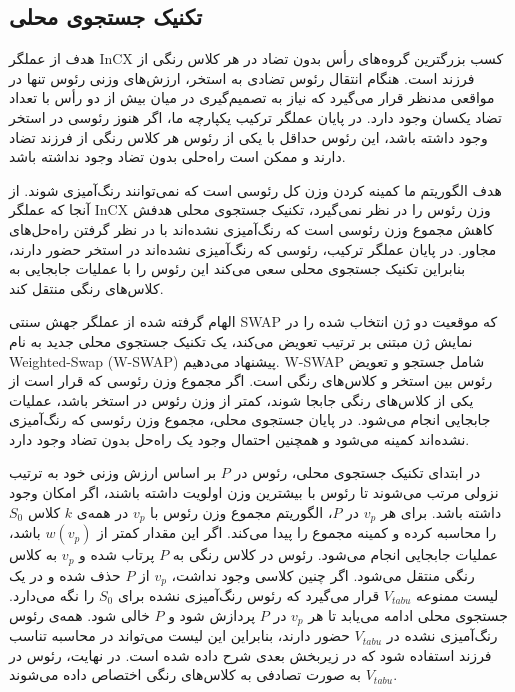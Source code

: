 \documentclass[a4paper,10pt]{article}
\begin{document}
        \subsection{تکنیک جستجوی محلی}
            
            هدف از عملگر InCX کسب بزرگترین گروه‌های رأس بدون تضاد در هر کلاس رنگی از فرزند است. هنگام انتقال رئوس تضادی به استخر، ارزش‌های وزنی رئوس تنها در مواقعی مدنظر قرار می‌گیرد که نیاز به تصمیم‌گیری در میان بیش از دو رأس با تعداد تضاد یکسان وجود دارد. در پایان عملگر ترکیب یکپارچه ما، اگر هنوز رئوسی در استخر وجود داشته باشد، این رئوس حداقل با یکی از رئوس هر کلاس رنگی از فرزند تضاد دارند و ممکن است راه‌حلی بدون تضاد وجود نداشته باشد.

            هدف الگوریتم ما کمینه کردن وزن کل رئوسی است که نمی‌توانند رنگ‌آمیزی شوند. از آنجا که عملگر InCX وزن رئوس را در نظر نمی‌گیرد، تکنیک جستجوی محلی هدفش کاهش مجموع وزن رئوسی است که رنگ‌آمیزی نشده‌اند با در نظر گرفتن راه‌حل‌های مجاور. در پایان عملگر ترکیب، رئوسی که رنگ‌آمیزی نشده‌اند در استخر حضور دارند، بنابراین تکنیک جستجوی محلی سعی می‌کند این رئوس را با عملیات جابجایی به کلاس‌های رنگی منتقل کند.

            الهام گرفته شده از عملگر جهش سنتی SWAP که موقعیت دو ژن انتخاب شده را در نمایش ژن مبتنی بر ترتیب تعویض می‌کند، یک تکنیک جستجوی محلی جدید به نام Weighted-Swap (W-SWAP) پیشنهاد می‌دهیم. W-SWAP شامل جستجو و تعویض رئوس بین استخر و کلاس‌های رنگی است. اگر مجموع وزن رئوسی که قرار است از یکی از کلاس‌های رنگی جابجا شوند، کمتر از وزن رئوس در استخر باشد، عملیات جابجایی انجام می‌شود. در پایان جستجوی محلی، مجموع وزن رئوسی که رنگ‌آمیزی نشده‌اند کمینه می‌شود و همچنین احتمال وجود یک راه‌حل بدون تضاد وجود دارد.

            در ابتدای تکنیک جستجوی محلی، رئوس در $P$ بر اساس ارزش وزنی خود به ترتیب نزولی مرتب می‌شوند تا رئوس با بیشترین وزن اولویت داشته باشند، اگر امکان وجود داشته باشد. برای هر $v_p$ در $P$، الگوریتم مجموع وزن رئوس با $v_p$ در همه‌ی $k$ کلاس $S_0$ را محاسبه کرده و کمینه مجموع را پیدا می‌کند. اگر این مقدار کمتر از $w(v_p)$ باشد، عملیات جابجایی انجام می‌شود. رئوس در کلاس رنگی به $P$ پرتاب شده و $v_p$ به کلاس رنگی منتقل می‌شود. اگر چنین کلاسی وجود نداشت، $v_p$ از $P$ حذف شده و در یک لیست ممنوعه $V_{tabu}$ قرار می‌گیرد که رئوس رنگ‌آمیزی نشده برای $S_0$ را نگه می‌دارد. جستجوی محلی ادامه می‌یابد تا هر $v_p$ در $P$ پردازش شود و $P$ خالی شود. همه‌ی رئوس رنگ‌آمیزی نشده در $V_{tabu}$ حضور دارند، بنابراین این لیست می‌تواند در محاسبه تناسب فرزند استفاده شود که در زیربخش بعدی شرح داده شده است. در نهایت، رئوس در $V_{tabu}$ به صورت تصادفی به کلاس‌های رنگی اختصاص داده می‌شوند.
\end{document}

